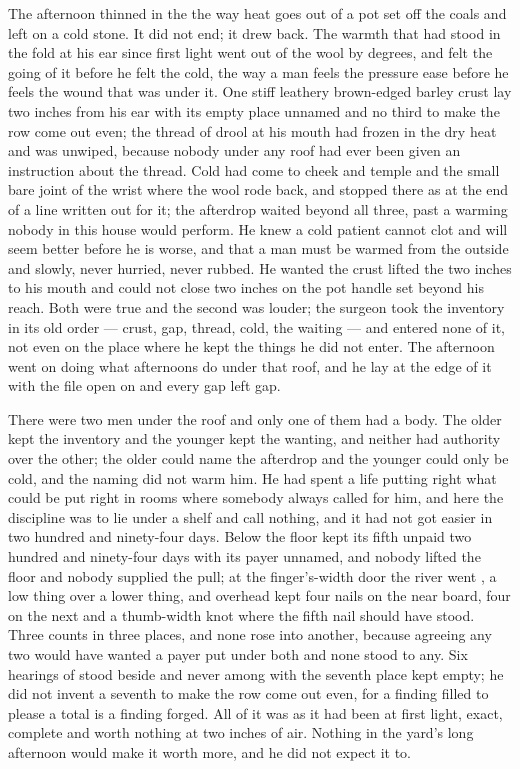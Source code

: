 The afternoon thinned in the  the way heat goes out of a pot set off the coals and left on a cold stone. It did not end; it drew back. The warmth that had stood in the fold at his ear since first light went out of the wool by degrees, and  felt the going of it before he felt the cold, the way a man feels the pressure ease before he feels the wound that was under it. One stiff leathery brown-edged barley crust lay two inches from his ear with its empty place unnamed and no third to make the row come out even; the thread of drool at his mouth had frozen in the dry heat and was unwiped, because nobody under any roof had ever been given an instruction about the thread. Cold had come to cheek and temple and the small bare joint of the wrist where the wool rode back, and stopped there as at the end of a line written out for it; the afterdrop waited beyond all three, past a warming nobody in this house would perform. He knew a cold patient cannot clot and will seem better before he is worse, and that a man must be warmed from the outside and slowly, never hurried, never rubbed. He wanted the crust lifted the two inches to his mouth and could not close two inches on the pot handle set beyond his reach. Both were true and the second was louder; the surgeon took the inventory in its old order --- crust, gap, thread, cold, the waiting --- and entered none of it, not even on the place where he kept the things he did not enter. The afternoon went on doing what afternoons do under that roof, and he lay at the edge of it with the file open on  and every gap left gap.

There were two men under the roof and only one of them had a body. The older kept the inventory and the younger kept the wanting, and neither had authority over the other; the older could name the afterdrop and the younger could only be cold, and the naming did not warm him. He had spent a life putting right what could be put right in rooms where somebody always called for him, and here the discipline was to lie under a shelf and call nothing, and it had not got easier in two hundred and ninety-four days. Below the floor  kept its fifth unpaid two hundred and ninety-four days with its payer unnamed, and nobody lifted the floor and nobody supplied the pull; at the finger's-width door the river went , a low thing over a lower thing, and overhead  kept four nails on the near board, four on the next and a thumb-width knot where the fifth nail should have stood. Three counts in three places, and none rose into another, because agreeing any two would have wanted a payer put under both and none stood to any. Six hearings of  stood beside and never among with the seventh place kept empty; he did not invent a seventh to make the row come out even, for a finding filled to please a total is a finding forged. All of it was as it had been at first light, exact, complete and worth nothing at two inches of air. Nothing in the yard's long afternoon would make it worth more, and he did not expect it to.

